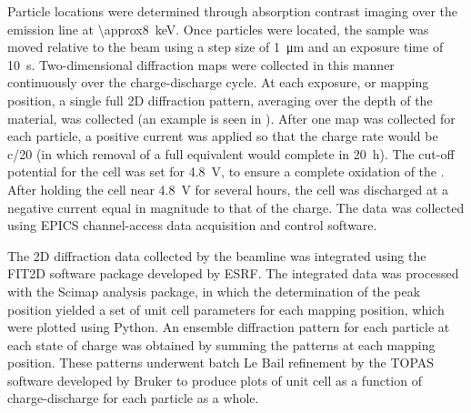 \documentclass{article}
\begin{document}
Particle locations were determined through absorption contrast imaging
over the  emission line at
\SI{\approx8}{\kilo\electronvolt}. Once particles were located, the
sample was moved relative to the beam using a step size of
\SI{1}{\micro\meter} and an exposure time of
\SI{10}{\second}. Two-dimensional diffraction maps were collected in
this manner continuously over the charge-discharge cycle. At each
exposure, or mapping position, a single full 2D diffraction pattern,
averaging over the depth of the material, was collected (an example is
seen in ). After one map was collected for each
particle, a positive current was applied so that the charge rate would
be c/20 (in which removal of a full  equivalent would complete
in \SI{20}{\hour}). The cut-off potential for the cell was set for
\SI{4.8}{\volt}, to ensure a complete oxidation of the \nca{}. After
holding the cell near \SI{4.8}{\volt} for several hours, the cell was
discharged at a negative current equal in magnitude to that of the
charge. The data was collected using EPICS channel-access data
acquisition and control software.

The 2D diffraction data collected by the beamline was integrated using
the FIT2D software package developed by
ESRF\cite{hausermann1996,hammersley1997}. The integrated data was
processed with the Scimap analysis package\cite{scimap}, in which the
determination of the peak position yielded a set of unit cell
parameters for each mapping position, which were plotted using
Python. An ensemble diffraction pattern for each particle at each
state of charge was obtained by summing the patterns at each mapping
position. These patterns underwent batch Le Bail refinement by the
TOPAS software developed by Bruker to produce plots of unit cell as a
function of charge-discharge for each particle as a whole.
\end{document}
